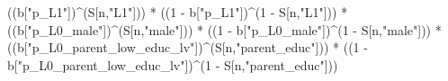 \documentclass[
]{book}
\newenvironment{Shaded}{\begin{snugshade}}{\end{snugshade}}
\newcommand{\DecValTok}[1]{\textcolor[rgb]{0.00,0.00,0.81}{#1}}
\newcommand{\NormalTok}[1]{#1}
\newcommand{\SpecialCharTok}[1]{\textcolor[rgb]{0.00,0.00,0.00}{#1}}
\newcommand{\StringTok}[1]{\textcolor[rgb]{0.31,0.60,0.02}{#1}}
\begin{document}
\begin{Shaded}
\begin{Highlighting}[]
\NormalTok{      ((b[}\StringTok{"p\_L1"}\NormalTok{])}\SpecialCharTok{\^{}}\NormalTok{(S[n,}\StringTok{"L1"}\NormalTok{])) }\SpecialCharTok{*}
\NormalTok{      ((}\DecValTok{1} \SpecialCharTok{{-}}\NormalTok{ b[}\StringTok{"p\_L1"}\NormalTok{])}\SpecialCharTok{\^{}}\NormalTok{(}\DecValTok{1} \SpecialCharTok{{-}}\NormalTok{ S[n,}\StringTok{"L1"}\NormalTok{])) }\SpecialCharTok{*}
\NormalTok{      ((b[}\StringTok{"p\_L0\_male"}\NormalTok{])}\SpecialCharTok{\^{}}\NormalTok{(S[n,}\StringTok{"male"}\NormalTok{])) }\SpecialCharTok{*} 
\NormalTok{      ((}\DecValTok{1} \SpecialCharTok{{-}}\NormalTok{ b[}\StringTok{"p\_L0\_male"}\NormalTok{])}\SpecialCharTok{\^{}}\NormalTok{(}\DecValTok{1} \SpecialCharTok{{-}}\NormalTok{ S[n,}\StringTok{"male"}\NormalTok{])) }\SpecialCharTok{*} 
\NormalTok{      ((b[}\StringTok{"p\_L0\_parent\_low\_educ\_lv"}\NormalTok{])}\SpecialCharTok{\^{}}\NormalTok{(S[n,}\StringTok{"parent\_educ"}\NormalTok{])) }\SpecialCharTok{*}
\NormalTok{      ((}\DecValTok{1} \SpecialCharTok{{-}}\NormalTok{ b[}\StringTok{"p\_L0\_parent\_low\_educ\_lv"}\NormalTok{])}\SpecialCharTok{\^{}}\NormalTok{(}\DecValTok{1} \SpecialCharTok{{-}}\NormalTok{ S[n,}\StringTok{"parent\_educ"}\NormalTok{]))}
    

\end{Highlighting}
\end{Shaded}
\end{document}
